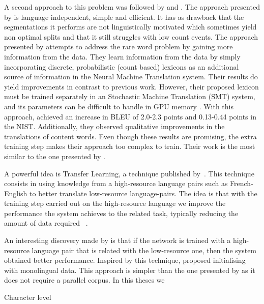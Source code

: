 A second approach to this problem was followed by \citet*{DBLP:journals/corr/SennrichHB15} and \citet*{DBLP:journals/corr/ArthurNN16}. The approach presented by \citet{DBLP:journals/corr/SennrichHB15} is language independent, simple and efficient. It has as drawback that the segmentations it performs are not linguistically motivated which sometimes yield non optimal splits and that it still struggles with low count events. The approach presented by \citet{DBLP:journals/corr/ArthurNN16} attempts to address the rare word problem by gaining more information from the data. They learn information from the data by simply incorporating discrete, probabilistic (count based) lexicons as an additional source of information in the Neural Machine Translation system.  Their results do yield improvements in contrast to previous work. However, their proposed lexicon must be trained separately in an Stochastic Machine Translation (SMT) system, and its parameters can be difficult to handle in GPU memory \citep{DBLP:journals/corr/abs-1710-01329}. With this approach, \citet{DBLP:journals/corr/ArthurNN16} achieved an increase in BLEU of 2.0-2.3 points and 0.13-0.44 points in the NIST. Additionally, they observed qualitative improvements in the translations of content words. Even though these results are promising, the extra training step makes their approach too complex to train. Their work is the most similar to the one presented by \citet{DBLP:journals/corr/abs-1710-01329}.

A powerful idea is Transfer Learning, a technique published by~\citet*{DBLP:journals/corr/ZophYMK16}. This technique consists in using knowledge from a high-resource language pairs such as French-English to better translate low-resource language-pairs. The idea is that with the training step carried out on the high-resource language we improve the performance the system achieves to  the related task, typically reducing the amount of data required ~\citep*{DBLP:journals/corr/ZophYMK16}.

An interesting discovery made by \citet{DBLP:journals/corr/ZophYMK16} is that if the network is trained with a high-resource language pair that is related with the low-resource one, then the system obtained better performance.
Inspired by this technique, \citet*{DBLP:journals/corr/abs-1710-04087} proposed initialising with monolingual data. This approach is simpler than the one presented by \citet{DBLP:journals/corr/ZophYMK16} as it does not require a parallel corpus. In this theses we

Character level



